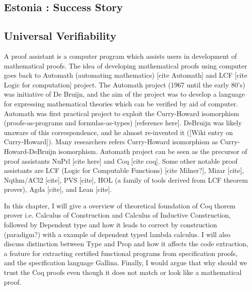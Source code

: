   
   \subsection{Estonia : Success Story}

   \subsection{Universal Verifiability}



A proof assistant is a computer program which assists users in development of mathematical proofs. The idea of 
developing mathematical proofs using computer goes back to Automath (automating mathematics)
[cite Automath] and LCF [cite Logic for computation] project. The 
Automath project (1967 until the early 80's)  was initiative of De Bruijn, and the aim of the project was to develop
a language for expressing mathematical theories which can be verified by aid of computer.  Automath was first 
practical project to exploit the Curry-Howard isomorphism (proofs-as-programs and formulas-as-types)
 [reference here]. DeBruijn  was likely unaware of this correspondence, and he almost re-invented it 
 ([Wiki entry on Curry-Howard]). Many researchers refers Curry-Howard isomorphism as 
 Curry-Howard-DeBruijn isomorphism. Automath project can be seen as the precursor of
 proof assistants NuPrl [cite here] and Coq [cite coq].   Some other notable  proof assistants are 
 LCF (Logic for Computable Functions)  [cite Milner?], Mizar [cite], Nqthm/ACl2 [cite], PVS [cite], 
 HOL (a family of tools derived from LCF theorem prover), Agda [cite], and Lean [cite].


In this chapter, I will give a overview of theoretical foundation of 
Coq thorem prover i.e. Calculus of Construction and  
Calculus of Inductive Construction, followed by Dependent type 
and how it leads to 
correct by construction (paradigm?) with a example of dependent 
typed lambda calculus. I will also discuss distinction between Type and Prop 
and how it affects the code extraction, a feature for extracting 
certified functional programs from specification proofs, and the 
specification language Gallina. Finally, I would 
argue that why should we trust the Coq proofs even though it does not 
match or look like a mathematical proof.



 

